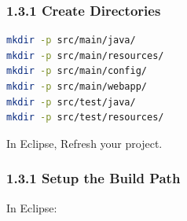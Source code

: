 \subsubsection*{1.3.1 Create Directories}
\begin{lstlisting}[language=bash,basicstyle=\scriptsize,backgroundcolor=\color{ubergray},caption={Directory creation for Linux
    users},frame=single,breaklines=true]
mkdir -p src/main/java/
mkdir -p src/main/resources/
mkdir -p src/main/config/
mkdir -p src/main/webapp/
mkdir -p src/test/java/
mkdir -p src/test/resources/
\end{lstlisting}
In Eclipse, Refresh your project.

\subsubsection*{1.3.1 Setup the Build Path}
In Eclipse:
